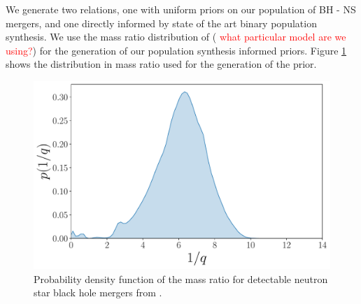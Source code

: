 \documentclass[twocolumn]{aastex631}
\newcommand{\red}[1]{\textcolor{red}{#1}}
\begin{document}
We generate two relations, one with uniform priors on our population of BH - NS mergers, and one directly informed by state of the art binary population synthesis. We use the mass ratio distribution of \cite{2021Broekgaarden+}  (\red{ what particular model are we using?}) for the generation of our population synthesis informed priors. Figure \ref{fig:mass ratio distrbution} shows the distribution in mass ratio used for the generation of the prior. 
\begin{figure}
		\centering
		\includegraphics[width=\linewidth]{NSBH_mass_ratio_density.pdf}
		\caption{Probability density function of the mass ratio for detectable neutron star black hole mergers from \citep{2021Broekgaarden+}.}
		\label{fig:mass ratio distrbution}
\end{figure}
\end{document}
